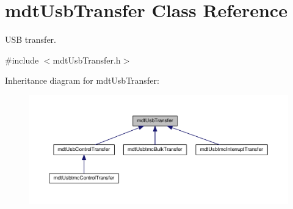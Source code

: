\hypertarget{classmdt_usb_transfer}{\section{mdt\-Usb\-Transfer Class Reference}
\label{classmdt_usb_transfer}
}


U\-S\-B transfer.  




{\ttfamily \#include $<$mdt\-Usb\-Transfer.\-h$>$}



Inheritance diagram for mdt\-Usb\-Transfer\-:
\nopagebreak
\begin{figure}[H]
\begin{center}
\leavevmode
\includegraphics[width=350pt]{classmdt_usb_transfer__inherit__graph}
\end{center}
\end{figure}
